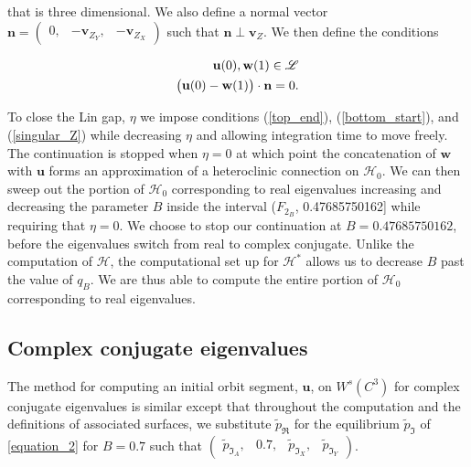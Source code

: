 \documentclass{ws-ijbc}
\begin{document}
\noindent
that is three dimensional.  We also define a normal vector $\mathbf{n} = \begin{pmatrix} 0, & -\mathbf{v}_{Z_Y}, &-\mathbf{v}_{Z_X} \end{pmatrix}$ such that $\mathbf{n} \perp \mathbf{v}_Z$.  We then define the conditions 

\begin{align}
	\begin{split}
		\mathbf{u}(0), \mathbf{w}(1) \in \mathscr{L} \\ \vspace{2mm}
		\begin{pmatrix}\mathbf{u}(0) - \mathbf{w}(1)\end{pmatrix} \cdot \mathbf{n} =0.
	\end{split}
	\label{singular_Z}
\end{align}

\noindent
To close the Lin gap, $\eta$ we impose conditions (\ref{top_end}), (\ref{bottom_start}), and (\ref{singular_Z}) while decreasing $\eta$ and allowing integration time to move freely.  The continuation is stopped when $\eta = 0$ at which point the concatenation of $\mathbf{w}$ with $\mathbf{u}$ forms an approximation of a heteroclinic connection on $\mathscr{H}_0$.  We can then sweep out the portion of $\mathscr{H}_0$ corresponding to real eigenvalues increasing and decreasing the parameter $B$ inside the interval ($F_{2_B}$, 0.47685750162] while requiring that $\eta=0$.  We choose to stop our continuation at $B = 0.47685750162$, before the eigenvalues switch from real to complex conjugate.  Unlike the computation of $\mathscr{H}$, the computational set up for $\mathscr{H^*}$ allows us to decrease $B$ past the value of $q_B$.  We are thus able to compute the entire portion of $\mathscr{H}_0$ corresponding to real eigenvalues.

\subsection{Complex conjugate eigenvalues}

The method for computing an initial orbit segment, $\mathbf{u}$, on $W^{s}(C^3)$ for complex conjugate eigenvalues is similar except that throughout the computation and the definitions of associated surfaces, we substitute $\tilde{p}_{\Re}$ for the equilibrium $\tilde{p}_{\Im}$ of \ref{equation_2} for $B=0.7$ such that $\begin{pmatrix}\tilde{p}_{\Im_A}, &0.7, &\tilde{p}_{\Im_X}, &\tilde{p}_{\Im_Y} \end{pmatrix}$.
\end{document}
